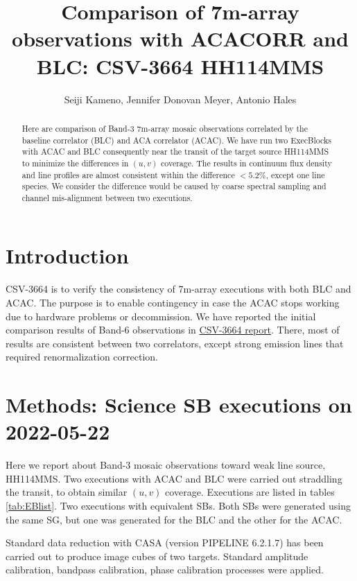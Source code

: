 \documentclass[a4paper, 10pt]{scrartcl}
\begin{document}
\title{Comparison of 7m-array observations with ACACORR and BLC: CSV-3664 HH114MMS}
\author{Seiji Kameno, Jennifer Donovan Meyer, Antonio Hales}
\maketitle
\begin{abstract}
Here are comparison of Band-3 7m-array mosaic observations correlated by the baseline correlator (BLC) and ACA correlator (ACAC).
We have run two ExecBlocks with ACAC and BLC consequently near the transit of the target source HH114MMS to minimize the differences in $(u, v)$ coverage.
The results in continuum flux density and line profiles are almost consistent within the difference $<5.2$\%, except one line species.
We consider the difference would be caused by coarse spectral sampling and channel mis-alignment between two executions.
\end{abstract}

\section{Introduction}
CSV-3664 is to verify the consistency of 7m-array executions with both BLC and ACAC. The purpose is to enable contingency in case the ACAC stops working due to hardware problems or decommission.
We have reported the initial comparison results of Band-6 observations in \href{http://www.alma.cl/~skameno/Documents/CSV-3664/}{CSV-3664 report}. There, most of results are consistent between two correlators, except strong emission lines that required renormalization correction.

\section{Methods: Science SB executions on 2022-05-22}
Here we report about Band-3 mosaic observations toward weak line source, HH114MMS. Two executions with ACAC and BLC were carried out straddling the transit, to obtain similar $(u,v)$ coverage.
Executions are listed in tables \ref{tab:EBlist}. Two executions with equivalent SBs. Both SBs were generated using the same SG, but one was generated for the BLC and the other for the ACAC.

Standard data reduction with CASA (version PIPELINE 6.2.1.7) has been carried out to produce image cubes of two targets.
Standard amplitude calibration, bandpass calibration, phase calibration processes were applied.
\end{document}
